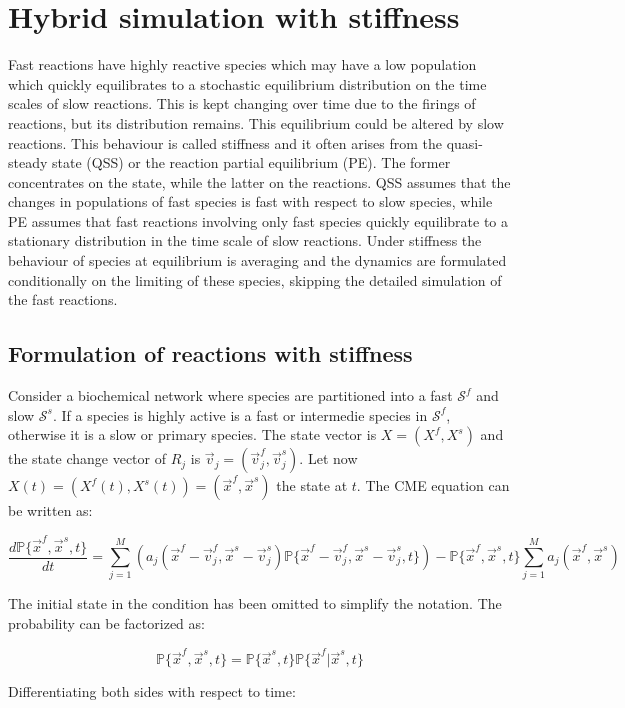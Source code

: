 \section{Hybrid simulation with stiffness}
Fast reactions have highly reactive species which may have a low population which quickly equilibrates to a stochastic equilibrium distribution on the time scales of slow reactions.
This is kept changing over time due to the firings of reactions, but its distribution remains.
This equilibrium could be altered by slow reactions.
This behaviour is called stiffness and it often arises from the quasi-steady state (QSS) or the reaction partial equilibrium (PE).
The former concentrates on the state, while the latter on the reactions.
QSS assumes that the changes in populations of fast species is fast with respect to slow species, while PE assumes that fast reactions involving only fast species quickly equilibrate to a stationary distribution in the time scale of slow reactions.
Under stiffness the behaviour of species at equilibrium is averaging and the dynamics are formulated conditionally on the limiting of these species, skipping the detailed simulation of the fast reactions.

  \subsection{Formulation of reactions with stiffness}
  Consider a biochemical network where species are partitioned into a fast $\mathcal{S}^f$ and slow $\mathcal{S}^s$.
  If a species is highly active is a fast or intermedie species in $\mathcal{S}^f$, otherwise it is a slow or primary species.
  The state vector is $X = (X^f, X^s)$ and the state change vector of $R_j$ is $\vec{v}_j = (\vec{v}_j^f, \vec{v}_j^s)$.
  Let now $X(t) = (X^f(t), X^s(t)) = (\vec{x}^f, \vec{x}^s)$ the state at $t$.
  The CME equation can be written as:

  $$\frac{d\mathbb{P}\{\vec{x}^f, \vec{x}^s, t\}}{dt} = \sum\limits_{j=1}^{M}(a_j(\vec{x}^f-\vec{v}_j^f, \vec{x}^s-\vec{v}_j^s)\mathbb{P}\{\vec{x}^f-\vec{v}_j^f,\vec{x}^s-\vec{v}_j^s, t\})-\mathbb{P}\{\vec{x}^f, \vec{x}^s, t\}\sum\limits_{j=1}^Ma_j(\vec{x}^f, \vec{x}^s)$$

  The initial state in the condition has been omitted to simplify the notation.
  The probability can be factorized as:

  $$\mathbb{P}\{\vec{x}^f, \vec{x}^s, t\} = \mathbb{P}\{\vec{x}^s, t\}\mathbb{P}\{\vec{x}^f|\vec{x}^s,t\}$$

  Differentiating both sides with respect to time:

